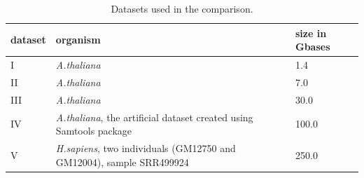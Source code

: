 \documentclass[10pt]{article}
\begin{document}
\begin{table}[!ht]
\small
\footnotesize
\caption{Datasets used in the comparison. }
\begin{center}
\begin{tabular}{|l|l|l|}
dataset &	organism &	size in Gbases\\
\hline
 I		&	{\it A.thaliana}	&	1.4	\\
 II	&	{\it A.thaliana}	&	7.0\\
  III	&	{\it A.thaliana}	&	30.0	\\
 IV	&{\it A.thaliana}, the artificial dataset created using Samtools package	&	100.0	\\
 V	&	{\it H.sapiens}, two individuals (GM12750 and GM12004), sample SRR499924		&	250.0\\

\end{tabular}
\end{center}
\label{table:datasets}
\normalsize
\end{table}%
\end{document}
